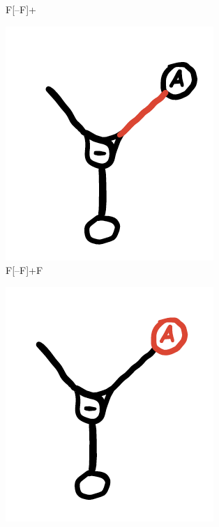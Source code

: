 \documentclass[12pt,twoside]{reedthesis}
\begin{document}
\begin{figure}[H]
\begin{subfigure}{0.3\textwidth}
		\caption{F[–F]+}
	\end{subfigure}
	\hfill
	\begin{subfigure}{0.3\textwidth}
		\centering
		\includegraphics[width=\textwidth, frame]{Images/Diagram9}
		\caption{F[–F]+F}
	\end{subfigure}
	\hfill
	\begin{subfigure}{0.3\textwidth}
		\centering
		\includegraphics[width=\textwidth, frame]{Images/Diagram10}

\end{subfigure}
\end{figure}
\end{document}

